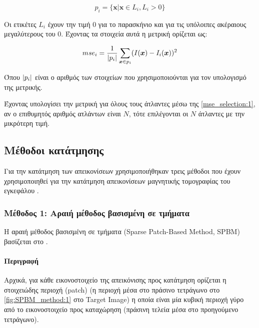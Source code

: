 \documentclass[a4paper,12pt]{article}
\newcommand{\paragraphLine}[1]{\paragraph{#1}\mbox{}}
\DeclarePairedDelimiter\abs{\lvert}{\rvert}
\begin{document}
\begin{equation*}
    p_i = \{\bm{x}| \bm{x} \in L_i, L_i > 0 \}
\end{equation*}

Οι ετικέτες $L_i$ έχουν την τιμή $0$ για το παρασκήνιο και για τις υπόλοιπες
ακέραιους μεγαλύτερους του $0$. Έχοντας τα στοιχεία αυτά η μετρική ορίζεται ως:

\begin{equation} \label{mse_selection:1}
    mse_i = \frac {1} {\abs{p_i}} \sum_{\bm{x} \in p_i} ( I(\bm{x}) -
                I_i(\bm{x})  )^2
\end{equation}

Όπου $\abs{p_i}$ είναι ο αριθμός των στοιχείων που χρησιμοποιούνται για τον
υπολογισμό της μετρικής.

Έχοντας υπολογίσει την μετρική για όλους τους άτλαντες μέσω της
\eqref{mse_selection:1}, αν ο επιθυμητός αριθμός ατλάντων είναι $N$, τότε
επιλέγονται οι $N$ άτλαντες με την μικρότερη τιμή.


\subsection{Μέθοδοι κατάτμησης}

Για την κατάτμηση των απεικονίσεων χρησιμοποιήθηκαν τρεις μέθοδοι που έχουν
χρησιμοποιηθεί για την κατάτμηση απεικονίσεων μαγνητικής τομογραφίας του
εγκεφάλου \cite{Zhang:1} \cite{Tong:1} \cite{Coupe:1}.

\subsubsection{Μέθοδος 1: Αραιή μέθοδος βασισμένη σε τμήματα} \label{SPBM:1}

Η αραιή μέθοδος βασισμένη σε τμήματα (Sparse Patch-Based Method, SPBM) βασίζεται
στο \cite{Zhang:1}. 

\paragraphLine{Περιγραφή}

Αρχικά, για κάθε εικονοστοιχείο της απεικόνισης προς κατάτμηση ορίζεται η
στοιχειώδης περιοχή (patch) (η περιοχή μέσα στο πράσινο τετράγωνο στο
\autoref{fig:SPBM_method:1} στο Target Image) η οποία είναι μία κυβική περιοχή
γύρο από το εικονοστοιχείο προς καταχώρηση (πράσινη τελεία μέσα στο προηγούμενο
τετράγωνο).
\end{document}
